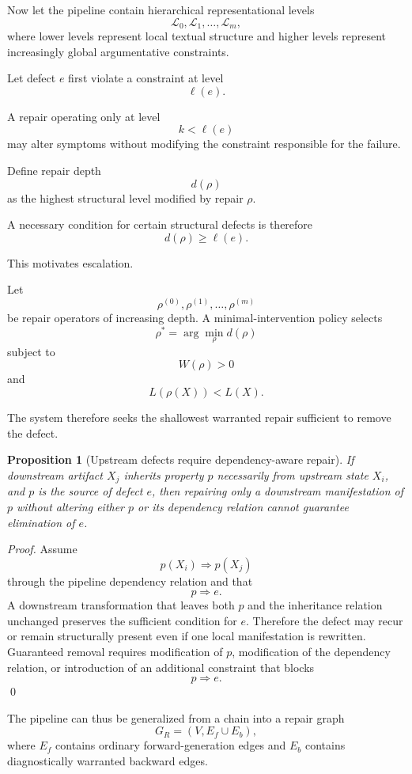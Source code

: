 \documentclass[11pt]{article}
\newtheorem{proposition}[definition]{Proposition}
\begin{document}
Now let the pipeline contain hierarchical representational levels
\[
    \mathcal{L}_0,
    \mathcal{L}_1,
    \ldots,
    \mathcal{L}_m,
\]
where lower levels represent local textual structure and higher levels represent increasingly global argumentative constraints.

Let defect \(e\) first violate a constraint at level
\[
    \ell(e).
\]

A repair operating only at level
\[
    k<\ell(e)
\]
may alter symptoms without modifying the constraint responsible for the failure.

Define repair depth
\[
    d(\rho)
\]
as the highest structural level modified by repair \(\rho\).

A necessary condition for certain structural defects is therefore
\[
    d(\rho)\geq\ell(e).
\]

This motivates escalation.

Let
\[
    \rho^{(0)},\rho^{(1)},\ldots,\rho^{(m)}
\]
be repair operators of increasing depth. A minimal-intervention policy selects
\[
    \rho^\ast
    =
    \arg\min_{\rho}
    d(\rho)
\]
subject to
\[
    W(\rho)>0
\]
and
\[
    L(\rho(X))<L(X).
\]

The system therefore seeks the shallowest warranted repair sufficient to remove the defect.

\begin{proposition}[Upstream defects require dependency-aware repair]
If downstream artifact \(X_j\) inherits property \(p\) necessarily from upstream state \(X_i\), and \(p\) is the source of defect \(e\), then repairing only a downstream manifestation of \(p\) without altering either \(p\) or its dependency relation cannot guarantee elimination of \(e\).
\end{proposition}

\begin{proof}
Assume
\[
    p(X_i)\Rightarrow p(X_j)
\]
through the pipeline dependency relation and that
\[
    p\Rightarrow e.
\]
A downstream transformation that leaves both \(p\) and the inheritance relation unchanged preserves the sufficient condition for \(e\). Therefore the defect may recur or remain structurally present even if one local manifestation is rewritten. Guaranteed removal requires modification of \(p\), modification of the dependency relation, or introduction of an additional constraint that blocks
\[
    p\Rightarrow e.
\]
\qed
\end{proof}

The pipeline can thus be generalized from a chain into a repair graph
\[
    G_R=(V,E_f\cup E_b),
\]
where \(E_f\) contains ordinary forward-generation edges and \(E_b\) contains diagnostically warranted backward edges.
\end{document}
